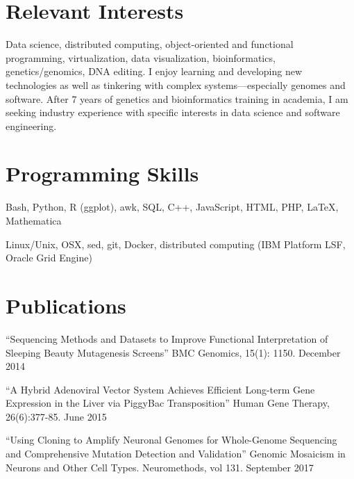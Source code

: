 \section{Relevant Interests}

\small{Data science, distributed computing, object-oriented and functional programming, virtualization, data visualization, bioinformatics, genetics/genomics, DNA editing. I enjoy learning and developing new technologies as well as tinkering with complex systems---especially genomes and software. After 7 years of genetics and bioinformatics training in academia, I am seeking industry experience with specific interests in data science and software engineering.}

\section{Programming Skills}
  \resumeSubHeadingListStart
  
          {Bash, Python, R (ggplot), awk, SQL, C++, JavaScript, HTML, PHP, \LaTeX, Mathematica}
          
          {Linux/Unix, OSX, sed, git, Docker, distributed computing (IBM Platform LSF, Oracle Grid Engine)}
          
  \resumeSubHeadingListEnd

\section{Publications}
  \resumeSubHeadingListStart
  
    { ``Sequencing Methods and Datasets to Improve Functional Interpretation of Sleeping Beauty Mutagenesis Screens'' BMC Genomics, 15(1): 1150. December 2014}
    
    { ``A Hybrid Adenoviral Vector System Achieves Efficient Long-term Gene Expression in the Liver via PiggyBac Transposition'' Human Gene Therapy, 26(6):377-85. June 2015}
    
    { ``Using Cloning to Amplify Neuronal Genomes for Whole-Genome Sequencing and Comprehensive Mutation Detection and Validation'' Genomic Mosaicism in Neurons and Other Cell Types. Neuromethods, vol 131. September 2017}
    
  \resumeSubHeadingListEnd


